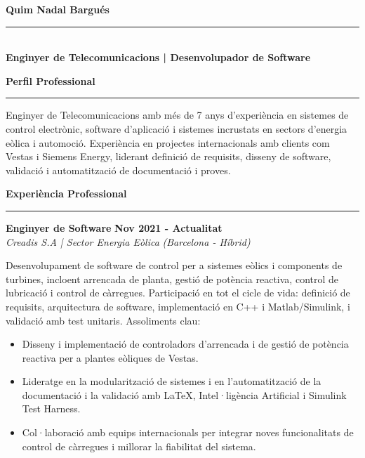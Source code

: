 \documentclass[11pt,a4paper]{article}
\newcommand{\cvsection}[1]{
    \vspace{0.5em}
    \noindent\textbf{\large #1}
    \vspace{0.5em}
    \hrule\vspace{0.5em}
}
\begin{document}
\begin{minipage}[t]{0.68\textwidth}
    \vspace*{-26\baselineskip}
    \nointerlineskip
    \begin{flushleft}
        {\fontsize{22}{0}\selectfont\bfseries Quim Nadal Bargués} \\
        \vspace{-8pt}
        \rule{\linewidth}{0.5pt} \\
        \vspace{4pt}
        {\large\bfseries Enginyer de Telecomunicacions | Desenvolupador de Software}
    \end{flushleft}
    
    \cvsection{Perfil Professional}
    Enginyer de Telecomunicacions amb més de 7 anys d'experiència en sistemes de control electrònic, software d'aplicació
    i sistemes incrustats en sectors d'energia eòlica i automoció. 
    Experiència en projectes internacionals amb clients com Vestas i Siemens Energy, liderant definició de requisits, 
    disseny de software, validació i automatització de documentació i proves.
   
    \cvsection{Experiència Professional}
    \noindent
    \textbf{Enginyer de Software} \hfill \textbf{Nov 2021 - Actualitat} \\
    \textit{Creadis S.A | Sector Energia Eòlica} \hfill \textit{(Barcelona - Híbrid)}
    
    Desenvolupament de software de control per a sistemes eòlics i components de turbines, incloent arrencada de planta, gestió de potència reactiva, 
    control de lubricació i control de càrregues. Participació en tot el cicle de vida: definició de requisits, arquitectura de software, implementació en C++ i Matlab/Simulink, 
    i validació amb test unitaris.
    Assoliments clau:
    \begin{itemize}[leftmargin=*,topsep=2pt,itemsep=-1pt]
        \item Disseny i implementació de controladors d'arrencada i de gestió de potència reactiva per a plantes eòliques de Vestas.
        \item Lideratge en la modularització de sistemes i en l'automatització de la documentació i la validació amb LaTeX, Intel·ligència Artificial i Simulink Test Harness.
        \item Col·laboració amb equips internacionals per integrar noves funcionalitats de control de càrregues i millorar la fiabilitat del sistema.
    \end{itemize}
    

\end{minipage}
\end{document}
